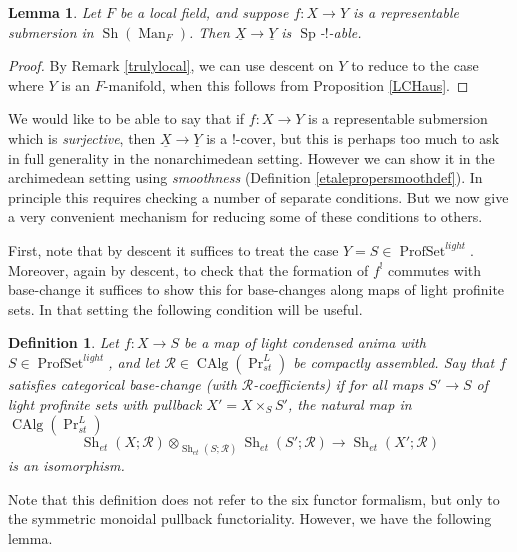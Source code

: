 \documentclass[12pt]{article}
\newtheorem{lemma}[theorem]{Lemma}
\newtheorem{definition}[theorem]{Definition}
\newcommand{\on}{\operatorname}
\newcommand{\mc}{\mathcal}
\newcommand{\ul}{\underline}
\begin{document}
\begin{lemma}\label{repsubsmooth}
Let $F$ be a local field, and suppose $f:X\to Y$ is a representable submersion in $\on{Sh}(\on{Man}_F)$.  Then $\underline{X}\to\underline{Y}$ is $\on{Sp}$-$!$-able.
\end{lemma}
\begin{proof}
By Remark \ref{trulylocal}, we can use descent on $Y$ to reduce to the case where $Y$ is an $F$-manifold, when this follows from Proposition \ref{LCHaus}.
\end{proof}

We would like to be able to say that if $f:X\to Y$ is a representable submersion which is \emph{surjective}, then $\ul{X}\to\ul{Y}$ is a $!$-cover, but this is perhaps too much to ask in full generality in the nonarchimedean setting.  However we can show it in the archimedean setting using \emph{smoothness} (Definition \ref{etalepropersmoothdef}).   In principle this requires checking a number of separate conditions.  But we now give a very convenient mechanism for reducing some of these conditions to others.

First, note that by descent it suffices to treat the case $Y=S\in\on{ProfSet}^{light}$.  Moreover, again by descent, to check that the formation of $f^!$ commutes with base-change it suffices to show this for base-changes along maps of light profinite sets.  In that setting the following condition will be useful.

\begin{definition}
Let $f:X\to S$ be a map of light condensed anima with $S\in\on{ProfSet}^{light}$, and let $\mathcal{R}\in\on{CAlg}(\on{Pr}^L_{st})$ be compactly assembled.  Say that $f$ \emph{satisfies categorical base-change} (with $\mathcal{R}$-coefficients) if for all maps $S'\to S$ of light profinite sets with pullback $X'=X\times_S S'$, the natural map in $\on{CAlg}(\on{Pr}_{st}^L)$
$$\on{Sh}_{et}(X;\mc{R})\otimes_{\on{Sh}_{et}(S;\mc{R})}\on{Sh}_{et}(S';\mc{R})\rightarrow \on{Sh}_{et}(X';\mc{R})$$
is an isomorphism.
\end{definition}

Note that this definition does not refer to the six functor formalism, but only to the symmetric monoidal pullback functoriality.  However, we have the following lemma.
\end{document}
